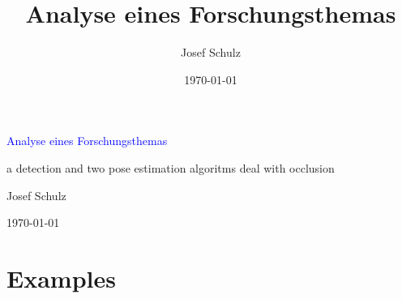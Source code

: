 \documentclass[xcolor=dvipsnames]{beamer}
\title{Analyse eines Forschungsthemas}
\author{Josef Schulz}
\date{\today}
\begin{document}

\begin{frame}
	\begin{center}
		\Large
		\textcolor{blue}{Analyse eines Forschungsthemas}
		
		\normalsize
		\vspace{0.2cm}
		a detection and two pose estimation algoritms deal with occlusion
		
		\vspace{1cm}
		Josef Schulz
		
		\vspace{1cm}
		\today
	\end{center}
\end{frame}

\section{Examples}
\end{document}

